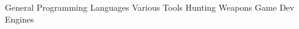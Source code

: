 

\begin{entrylist}
    \tagentry%
		{General}
		{Programming Languages}
		{}
        {\tagsep{}\tagsep{}\tagsep{}
        \tagsep{}\tagsep{}\tagsep{}}
    \tagentry%
        {}
        {Various Tools}
        {}
        {\tagsep{}\tagsep{}
        \tagsep\skilltag{\LaTeX}} 
    \tagentry%
		{Hunting}
		{Weapons}
		{}
        {\tagsep{}\tagsep{}}
    \tagentry%
		{Game Dev}
		{Engines}
		{}
        {\tagsep{}\tagsep{}}
\end{entrylist}

